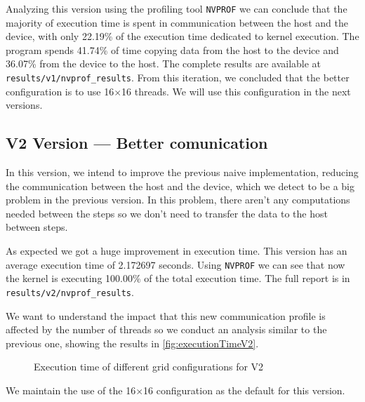 \documentclass[conference]{IEEEtran}
\begin{document}
Analyzing this version using the profiling tool \texttt{NVPROF} we can conclude that the majority of execution time is spent in communication between the host and the device, with only  22.19\% of the execution time dedicated to kernel execution. The program spends 41.74\% of time copying data from the host to the device and 36.07\% from the device to the host. The complete results are available at \texttt{results/v1/nvprof\_results}.
From this iteration, we concluded that the better configuration is to use 16$\times$16 threads. We will use this configuration in the next versions.

\subsection{V2 Version --- Better comunication}
In this version, we intend to improve the previous naive implementation, reducing the communication between the host and the device, which we detect to be a big problem in the previous version. In this problem, there aren't any computations needed between the steps so we don't need to transfer the data to the host between steps.

As expected we got a huge improvement in execution time. This version has an average execution time of 2.172697 seconds. Using \texttt{NVPROF} we can see that now the kernel is executing 100.00\% of the total execution time. The full report is in \texttt{results/v2/nvprof\_results}.

We want to understand the impact that this new communication profile is affected by the number of threads so we conduct an analysis similar to the previous one, showing the results in \autoref{fig:executionTimeV2}.

\begin{figure}[ht]
  \centering
  \caption{Execution time of different grid configurations for V2}
  \label{fig:executionTimeV2}
\end{figure}
We maintain the use of the 16$\times$16 configuration as the default for this version.
\end{document}
